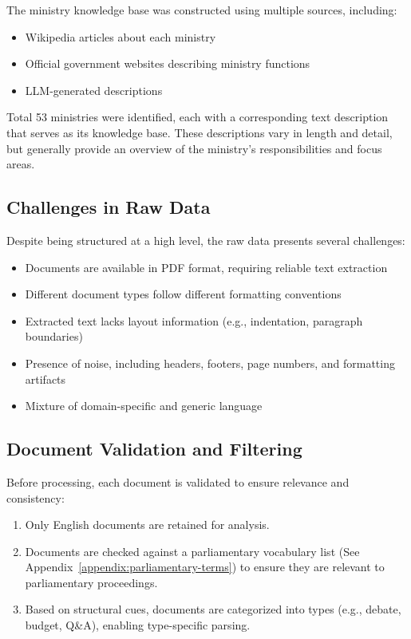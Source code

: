 \documentclass{report}
\begin{document}
The ministry knowledge base was constructed using multiple sources, including:
\begin{itemize}[leftmargin=+.5in]
    \item Wikipedia articles about each ministry
    \item Official government websites describing ministry functions
    \item LLM-generated descriptions
\end{itemize}
Total 53 ministries were identified, each with a corresponding text description that serves as its knowledge base. These descriptions vary in length and detail, but generally provide an overview of the ministry's responsibilities and focus areas.

\subsection{Challenges in Raw Data}
Despite being structured at a high level, the raw data presents several challenges:
\begin{itemize}
    \item Documents are available in PDF format, requiring reliable text extraction
    \item Different document types follow different formatting conventions
    \item Extracted text lacks layout information (e.g., indentation, paragraph boundaries)
    \item Presence of noise, including headers, footers, page numbers, and formatting artifacts
    \item Mixture of domain-specific and generic language
\end{itemize}

\subsection{Document Validation and Filtering}
Before processing, each document is validated to ensure relevance and consistency:
\begin{enumerate}
    \item  Only English documents are retained for analysis.
    \item Documents are checked against a parliamentary vocabulary list (See Appendix~\ref{appendix:parliamentary-terms}) to ensure they are relevant to parliamentary proceedings.
    \item Based on structural cues, documents are categorized into types (e.g., debate, budget, Q\&A), enabling type-specific parsing.
\end{enumerate}
\end{document}
